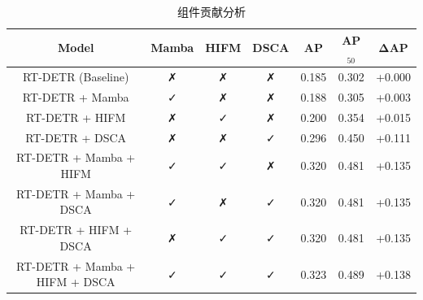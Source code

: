 \begin{table}[h]
\centering
\caption{组件贡献分析}
\label{tab:ablation}
\begin{tabular}{c|c|c|c|c|c|c}
\hline
Model & Mamba & HIFM & DSCA & AP & AP$_{50}$ & ΔAP \\
\hline
RT-DETR (Baseline) & ✗ & ✗ & ✗ & 0.185 & 0.302 & +0.000 \\
\hline
RT-DETR + Mamba & ✓ & ✗ & ✗ & 0.188 & 0.305 & +0.003 \\
\hline
RT-DETR + HIFM & ✗ & ✓ & ✗ & 0.200 & 0.354 & +0.015 \\
\hline
RT-DETR + DSCA & ✗ & ✗ & ✓ & 0.296 & 0.450 & +0.111 \\
\hline
RT-DETR + Mamba + HIFM & ✓ & ✓ & ✗ & 0.320 & 0.481 & +0.135 \\
\hline
RT-DETR + Mamba + DSCA & ✓ & ✗ & ✓ & 0.320 & 0.481 & +0.135 \\
\hline
RT-DETR + HIFM + DSCA & ✗ & ✓ & ✓ & 0.320 & 0.481 & +0.135 \\
\hline
RT-DETR + Mamba + HIFM + DSCA & ✓ & ✓ & ✓ & 0.323 & 0.489 & +0.138 \\
\hline
\end{tabular}
\end{table}
